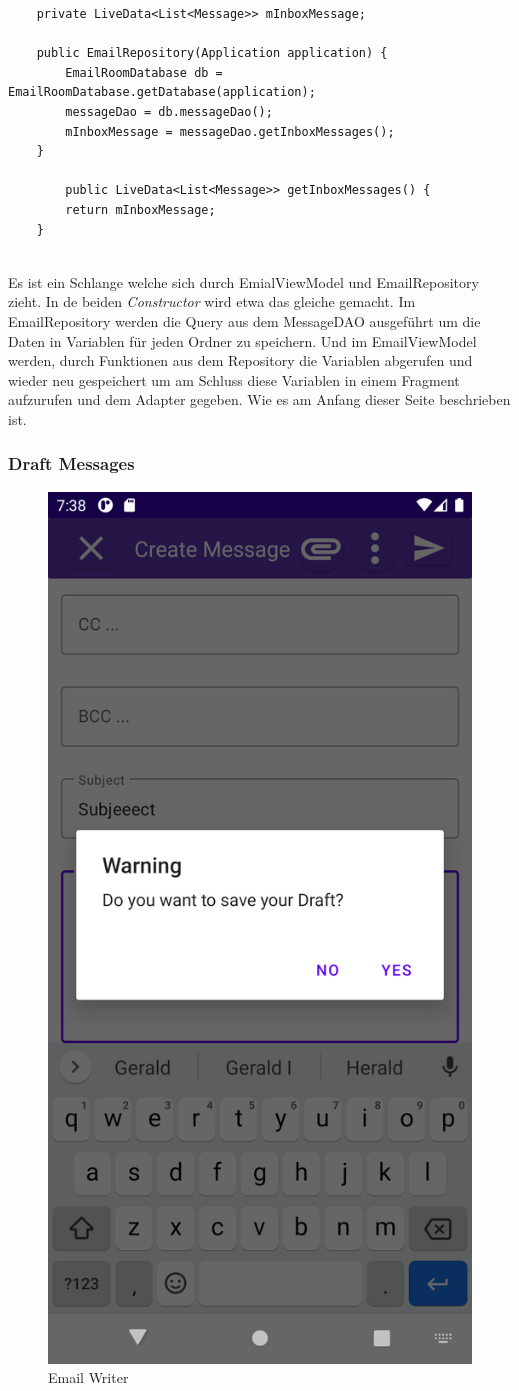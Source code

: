 \documentclass[a4paper,11pt]{article}
\begin{document}
\lstset{language=java}
\begin{lstlisting}
    private LiveData<List<Message>> mInboxMessage;

    public EmailRepository(Application application) {
        EmailRoomDatabase db = EmailRoomDatabase.getDatabase(application);
        messageDao = db.messageDao();
        mInboxMessage = messageDao.getInboxMessages();
    }

        public LiveData<List<Message>> getInboxMessages() {
        return mInboxMessage;
    }


\end{lstlisting}

Es ist ein Schlange welche sich durch EmialViewModel und EmailRepository zieht. In de beiden \textit{Constructor} wird etwa das gleiche gemacht. Im EmailRepository
werden die Query aus dem MessageDAO ausgeführt um die Daten in Variablen für jeden Ordner zu speichern. Und im EmailViewModel werden, durch Funktionen aus dem Repository 
die Variablen abgerufen und wieder neu gespeichert um am Schluss diese Variablen in einem Fragment aufzurufen und dem Adapter gegeben. Wie es am Anfang dieser Seite beschrieben 
ist.

\subsubsection{Draft Messages}

\begingroup
\setlength{\intextsep}{5pt}
\setlength{\columnsep}{4pt}

\begin{figure}
    \centering
        \includegraphics[width=.3\textwidth]{media/EWAttention.png}
        \caption{Email Writer}
\end{figure}
\end{document}
